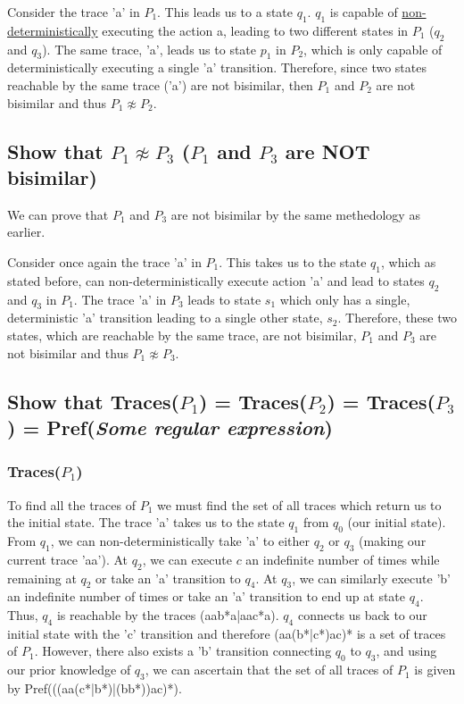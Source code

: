 \documentclass{article}[8pt]
\renewcommand{\thesubsubsection}{\thesection.\alph{subsection}.\Roman{subsubsection}}
\renewcommand{\thesubsection}{\thesection.\alph{subsection}}
\begin{document}
Consider the trace 'a' in $P_1$. This leads us to a state $q_1$. $q_1$ is capable of \underline{non-deterministically} executing the action a, leading to two different states in $P_1$ ($q_2$ and $q_3$). The same trace, 'a', leads us to state $p_1$ in $P_2$, which is only capable of deterministically executing a single 'a' transition. Therefore, since two states reachable by the same trace ('a') are not bisimilar, then $P_1$ and $P_2$ are not bisimilar and thus $P_1 \not\approx P_2$.

\subsection[~\thesubsection]{Show that $P_1 \not\approx P_3$ ($P_1$ and $P_3$ are NOT bisimilar)}

We can prove that $P_1$ and $P_3$ are not bisimilar by the same methedology as earlier.

Consider once again the trace 'a' in $P_1$. This takes us to the state $q_1$, which as stated before, can non-deterministically execute action 'a' and lead to states $q_2$ and $q_3$ in $P_1$. The trace 'a' in $P_3$ leads to state $s_1$ which only has a single, deterministic 'a' transition leading to a single other state, $s_2$. Therefore, these two states, which are reachable by the same trace, are not bisimilar, $P_1$ and $P_3$ are not bisimilar and thus $P_1 \not\approx P_3$.

\subsection[~\thesubsection]{Show that Traces($P_1$) = Traces($P_2$) = Traces($P_3$) = Pref(\emph{Some regular expression})}

\subsubsection[~\thesubsubsection]{Traces($P_1$)}
To find all the traces of $P_1$ we must find the set of all traces which return us to the initial state. The trace 'a' takes us to the state $q_1$ from $q_0$ (our initial state). From $q_1$, we can non-deterministically take 'a' to either $q_2$ or $q_3$ (making our current trace 'aa'). At $q_2$, we can execute $c$ an indefinite number of times while remaining at $q_2$ or take an 'a' transition to $q_4$. At $q_3$, we can similarly execute 'b' an indefinite number of times or take an 'a' transition to end up at state $q_4$. Thus, $q_4$ is reachable by the traces (aab*a|aac*a). $q_4$ connects us back to our initial state with the 'c' transition and therefore (aa(b*|c*)ac)* is a set of traces of $P_1$. However, there also exists a 'b' transition connecting $q_0$ to $q_3$, and using our prior knowledge of $q_3$, we can ascertain that the set of all traces of $P_1$ is given by Pref(((aa(c*|b*)|(bb*))ac)*).
\end{document}

